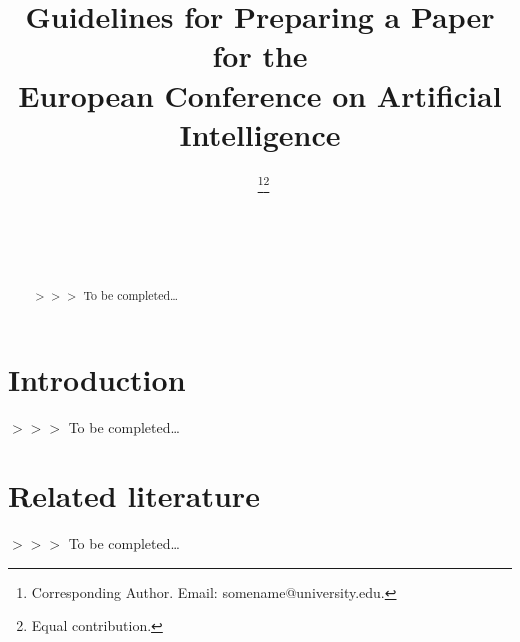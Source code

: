 \documentclass{ecai}
\newcommand{\edcom}[1]{{\sf\color{red}$>>>$ #1}}
\newcommand{\tbc}{\edcom{To be completed\ldots}}
\begin{document}
	\begin{frontmatter}
		
		
		
		
		\title{Guidelines for Preparing a Paper for the \\
			European Conference on Artificial Intelligence}
		
		
		\author[A]{~\thanks{Corresponding Author. Email: somename@university.edu.}\footnote{Equal contribution.}}
		\author[B]{~\footnotemark}
		\author[B,C]{~} 
		
		\address[A]{Short Affiliation of First Author}
		\address[B]{Short Affiliation of Second Author and Third Author}
		\address[C]{Short Alternate Affiliation of Third Author}
		
		
		\begin{abstract}
			\tbc
		\end{abstract}
		
	\end{frontmatter}
	\section{Introduction}\label{sec:introduction}
	\tbc
	\section{Related literature}\label{sec:related-literature}
	\tbc
\end{document}
